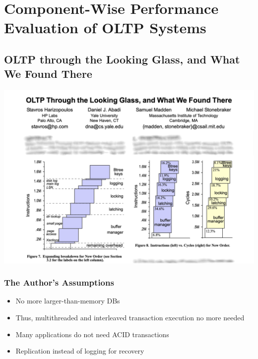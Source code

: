 \section{Component-Wise Performance Evaluation of OLTP Systems}

\frame{\sectionpage}

\subsection[OLTP through the Looking Glass, and What We Found There]{OLTP through the Looking Glass, and What We Found There \cite{Harizopoulos:2008}}

\frame{\subsectionpage}

\begin{frame}
    \centering
    \includegraphics[width = \linewidth]{data/oltp_through_the_looking_glass.png}
\end{frame}

\begin{frame}
    \frametitle{The Author's Assumptions}

    \begin{itemize}
        \item<2->   No more larger-than-memory DBs
        \item<3->   Thus, multithreaded and interleaved transaction execution no more needed
        \item<4->   Many applications do not need ACID transactions
        \item<5->   Replication instead of logging for recovery
    \end{itemize}
\end{frame}

